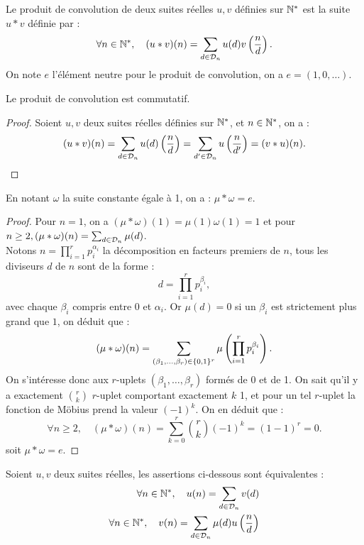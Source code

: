\begin{defn}
Le produit de convolution de deux suites réelles $u, v$ définies sur $\mathbb{N}^\ast$ est la suite $u \ast v$ définie par :
\[ \forall n \in \mathbb{N}^\ast, \quad (u \ast v)(n) = \sum_{d \in \mathcal{D}_n} u(d) v \left ( \dfrac{n}{d} \right) . \]
On note $e$ l'élément neutre pour le produit de convolution, on a $e=(1, 0, \dots )$.
\end{defn}

\begin{lem}
Le produit de convolution est commutatif.
\end{lem}

\begin{proof}
Soient $u, v$ deux suites réelles définies sur $\mathbb{N}^\ast$, et $n \in \mathbb{N}^\ast$, on a :
\[ (u \ast v)(n) = \sum_{d \in \mathcal{D}_n} u(d) \left ( \dfrac{n}{d} \right) = \sum_{d' \in \mathcal{D}_n} u \left ( \dfrac{n}{d'} \right)  = (v \ast u)(n) . \]
\end{proof}

\begin{lem}
En notant $\omega$ la suite constante égale à 1, on a :
$\mu \ast \omega = e$.
\end{lem}

\begin{proof}
Pour $n=1$, on a $(\mu \ast \omega)(1) = \mu(1) \omega(1) = 1$ 
et pour $n \geq 2, (\mu \ast \omega)(n) = \sum_{d \in \mathcal{D}_n} \mu(d)$. \\ 
Notons $n = \prod_{i=1}^r p_i^{\alpha_i}$ la décomposition en facteurs premiers de $n$, 
tous les diviseurs $d$ de $n$ sont de la forme :
\[ d = \prod_{i=1}^r p_i^{\beta_i} , \]
avec chaque $\beta_i$ compris entre 0 et $\alpha_i$. 
Or $\mu(d) = 0$ si un $\beta_i$ est strictement plus grand que $1$, on déduit que :
\[ (\mu \ast \omega)(n) = \sum_{(\beta_1, \dots, \beta_r) \in \{ 0,1 \}^r} \mu \left ( \prod_{i=1}^r p_i^{\beta_i} \right ) . \]
On s'intéresse donc aux $r$-uplets $(\beta_1, \dots, \beta_r)$ formés de 0 et de 1. 
On sait qu'il y a exactement $\binom{r}{k}$ $r$-uplet comportant exactement $k$ 1,
et pour un tel $r$-uplet la fonction de Möbius prend la valeur $(-1)^k$. 
On en déduit que :
\[ \forall n \geq 2, \quad (\mu \ast \omega)(n) = \sum_{k=0}^r \binom{r}{k} (-1)^k = (1-1)^r = 0 . \]
soit $\mu \ast \omega = e$.
\end{proof}

\begin{thm}
\label{thm:invMob}
Soient $u, v$ deux suites réelles, les assertions ci-dessous sont équivalentes :
\begin{align}
    \forall n \in \mathbb{N}^\ast, \quad u(n) = \sum_{d \in \mathcal{D}_n} v(d) \label{eq:m1} \\
    \forall n \in \mathbb{N}^\ast, \quad v(n) = \sum_{d \in \mathcal{D}_n} \mu(d) u \left (\dfrac{n}{d} \right ) \label{eq:m2}
\end{align}
\end{thm}

